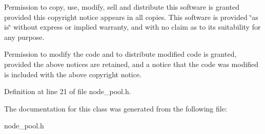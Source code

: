 Permission to copy, use, modify, sell and distribute this software is granted provided this copyright notice appears in all copies. This software is provided \char`\"{}as is\char`\"{} without express or implied warranty, and with no claim as to its suitability for any purpose.

Permission to modify the code and to distribute modified code is granted, provided the above notices are retained, and a notice that the code was modified is included with the above copyright notice. 



Definition at line 21 of file node\_\-pool.h.

The documentation for this class was generated from the following file:\begin{CompactItemize}
\item 
node\_\-pool.h\end{CompactItemize}
